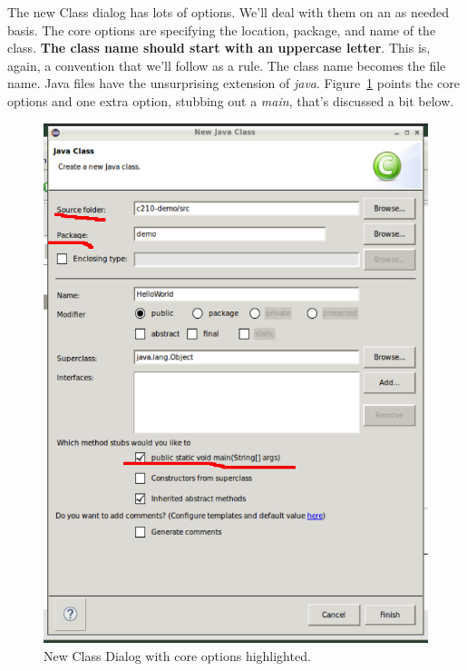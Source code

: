 \documentclass[nobib]{tufte-handout}
\begin{document}
The new Class dialog has lots of options. We'll deal with them on an as needed basis. The core options are specifying the location, package, and name of the class. \textbf{The class name should start with an uppercase letter}. This is, again, a convention that we'll follow as a rule. The class name becomes the file name. Java files have the unsurprising extension of \textit{java}. Figure~\ref{fig:newclass} points the core options and one extra option, stubbing out a \textit{main}, that's discussed a bit below.

\vspace{.1in}
\begin{center}
\begin{figure}[h]
\includegraphics[scale=.5]{Eclipse-NewClass.png}
\caption{New Class Dialog with core options highlighted.}
\label{fig:newclass}
\end{figure}
\end{center}
\vspace{.1in}
\end{document}
